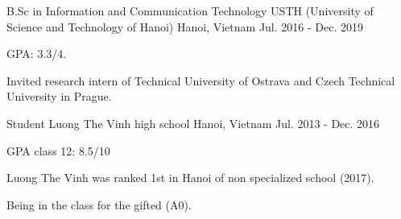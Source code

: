 

\begin{cventries}

  \cventry
    {B.Sc in Information and Communication Technology} %
    {USTH (University of Science and Technology of Hanoi)} %
    {Hanoi, Vietnam} %
    {Jul. 2016 - Dec. 2019} %
    {
      \begin{cvitems} %
        \item GPA: 3.3/4.
        \item {Invited research intern of Technical University of Ostrava and Czech Technical University in Prague.}
      \end{cvitems}
    }
    
  \cventry
    {Student} %
    {Luong The Vinh high school} %
    {Hanoi, Vietnam} %
    {Jul. 2013 - Dec. 2016} %
    {
      \begin{cvitems} %
        \item {GPA class 12: 8.5/10}
        \item {Luong The Vinh was ranked 1st in Hanoi of non specialized school (2017).}
        \item {Being in the class for the gifted (A0).}
      \end{cvitems}
    }

\end{cventries}

